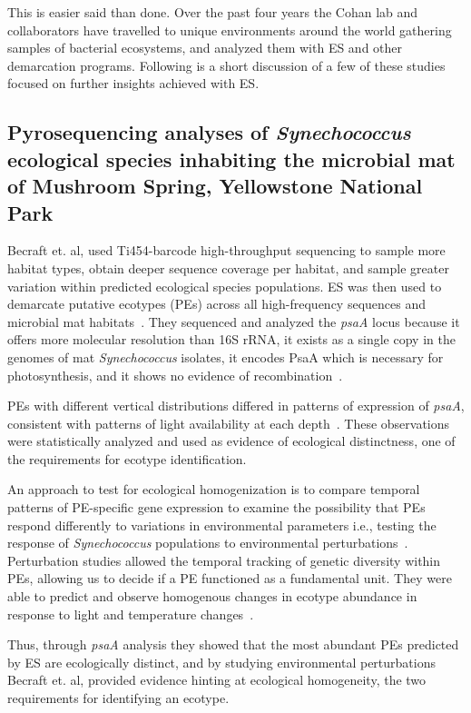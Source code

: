 This is easier said than done.
Over the past four years the Cohan lab and collaborators have travelled to unique environments around the world gathering samples of bacterial ecosystems, and analyzed them with ES and other demarcation programs.
Following is a short discussion of a few of these studies focused on further insights achieved with ES.

\subsection*{Pyrosequencing analyses of \emph{Synechococcus} ecological species inhabiting the microbial mat of Mushroom Spring, Yellowstone National Park}
Becraft et. al, used Ti454-barcode high-throughput sequencing to sample more habitat types, obtain deeper sequence coverage per habitat, and sample greater variation within predicted ecological species populations.
ES was then used to demarcate putative ecotypes (PEs) across all high-frequency sequences and microbial mat habitats~\cite{pyroEric}. They sequenced and analyzed the \emph{psaA} locus because it offers more molecular resolution than 16S rRNA, it exists as a single copy in the genomes of mat \emph{Synechococcus} isolates, it encodes PsaA which is necessary for photosynthesis, and it shows no evidence of recombination~\cite{pyroEric}.

PEs with different vertical distributions differed in patterns of expression of \emph{psaA}, consistent with patterns of light availability at each depth~\cite{pyroEric}.
These observations were statistically analyzed and used as evidence of ecological distinctness, one of the requirements for ecotype identification.

An approach to test for ecological homogenization is to compare temporal patterns of PE-specific gene expression to examine the possibility that PEs respond differently to variations in environmental parameters i.e., testing the response of \emph{Synechococcus} populations to environmental perturbations~\cite{pyroEric}.
Perturbation studies allowed the temporal tracking of genetic diversity within PEs, allowing us to decide if a PE functioned as a fundamental unit.
They were able to predict and observe homogenous changes in ecotype abundance in response to light and temperature changes~\cite{pyroEric}.

Thus, through \emph{psaA} analysis they showed that the most abundant PEs predicted by ES are ecologically distinct, and by studying environmental perturbations Becraft et. al, provided evidence hinting at ecological homogeneity, the two requirements for identifying an ecotype.

